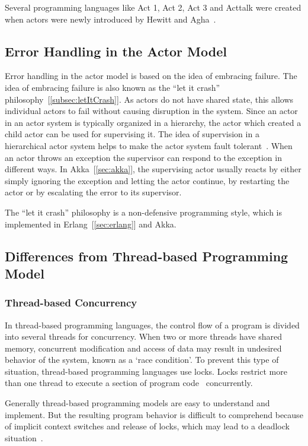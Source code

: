   Several programming languages like Act 1, Act 2, Act 3 and Acttalk were created when actors were newly introduced by Hewitt and Agha~\cite{agha, hewitt}.

\subsection{Error Handling in the Actor Model}
Error handling in the actor model is based on the idea of embracing failure. The idea of embracing failure is also known as the “let it crash” philosophy~[\autoref{subsec:letItCrash}]. As actors do not have shared state, this allows individual actors to fail without causing disruption in the system. Since an actor in an actor system is typically organized in a hierarchy, the actor which created a child actor can be used for supervising it. The idea of supervision in a hierarchical actor system helps to make the actor system fault tolerant~\cite{Erb2012}. When an actor throws an exception the supervisor can respond to the exception in different ways. In Akka~[\autoref{sec:akka}], the supervising actor usually reacts by either simply ignoring the exception and letting the actor continue, by restarting the actor or by escalating the error to its supervisor.

  The “let it crash” philosophy is a non-defensive programming style, which is implemented in Erlang~[\autoref{sec:erlang}] and Akka.

\subsection{Differences from Thread-based Programming Model}
\subsubsection{Thread-based Concurrency}
  \label{subsec:thread}
  In thread-based programming languages, the control flow of a program is divided into several threads for concurrency. When two or more threads have shared memory, concurrent modification and access of data may result in undesired behavior of the system, known as a ‘race condition’. To prevent this type of situation, thread-based programming languages use locks. Locks restrict more than one thread to execute a section of program code~\cite{ambientTalk} concurrently.

  Generally thread-based programming models are easy to understand and implement. But the resulting program behavior is difficult to comprehend because of implicit context switches and release of locks, which may lead to a deadlock situation~\cite{ambientTalk}.


